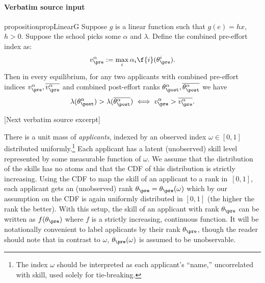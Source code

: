 \documentclass[10pt]{article}
\begin{document}
\paragraph{Verbatim source input}
\begin{ReviewVerbatim}
\begin{restatable}{proposition}{propLinearG}
	Suppose $g$ is a
	linear function such that $g(e) = h x$, $h > 0$. %
	Suppose the school picks some $\alpha$ and $\lambda$. Define the combined pre-effort index as:
	\begin{align*}
		v_\pre^\alpha := \max_i \alpha_i\f{i}(\theta_\pre^i).
	\end{align*}
	Then in every equilibrium, for any two applicants with combined pre-effort indices $v_\pre^\alpha, \overline{v_\pre^\alpha}$ and  combined post-effort ranks $\theta_\post^\alpha, \overline{\theta_\post^\alpha}$ we have
	\begin{equation*}
	\lambda(\theta_\post^\alpha) >  \lambda(\overline{\theta_\post^\alpha}) \iff v_\pre^\alpha >  \overline{v_\pre^\alpha}.
	\end{equation*}
	\label{prop:linearg}
\end{restatable}

[Next verbatim source excerpt]

There is a unit mass of \textit{applicants}, indexed by an observed index $\omega \in [0,1]$ distributed uniformly.\footnote{The index $\omega$ should be interpreted as each applicant's ``name,'' uncorrelated with skill, used solely for tie-breaking.}  Each applicant has a latent (unobserved) skill level represented by some measurable function of $\omega$.
We assume that {the distribution of the skills} has no atoms and that the CDF of this distribution is strictly increasing.
Using the CDF to map the skill of an applicant to a rank in~$[0,1]$, each applicant gets an (unobserved) rank $\theta_\pre =\theta_\pre(\omega)$ which by our assumption on the CDF is again uniformly distributed in $[0, 1]$ (the higher the rank the better).  With this setup, the skill of an applicant with rank $\theta_\pre$ can be written as $f(\theta_\pre)$ where $f$ is a strictly increasing, continuous function.  {It will be notationally convenient to label applicants by their rank $\theta_\pre$, though the reader should note that in contrast to $\omega$, $\theta_\pre(\omega)$ is assumed to be unobservable.}




\end{ReviewVerbatim}
\end{document}

